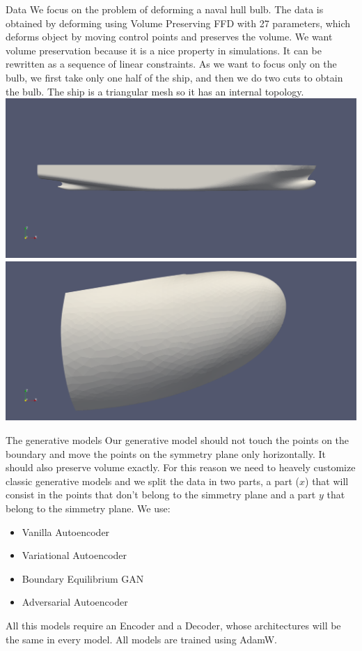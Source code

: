\documentclass{beamer}
\begin{document}
\begin{frame}{Data}
We focus on the problem of deforming a naval hull bulb. The data is obtained by deforming using Volume Preserving FFD with 27 parameters, which deforms object by moving control points and preserves the volume. We want volume preservation because it is a nice property in simulations. It can be rewritten as a sequence of linear constraints. As we want to focus only on the bulb, we first take only one half of the ship, and then we do two cuts to obtain the bulb.  The ship is a triangular mesh so it has an internal topology.\\
\includegraphics[scale=0.08]{naval}
\includegraphics[scale=0.08]{bulbo}
\end{frame}
\begin{frame}{The generative models}
Our generative model should not touch the points on the boundary and move the points on the symmetry plane only horizontally. It should also preserve volume exactly. For this reason we need to heavely customize classic generative models and we split the data in two parts, a part ($x$) that will consist in the points that don't belong to the simmetry plane and a part $y$ that belong to the simmetry plane.
We use:
\begin{itemize}
\item Vanilla Autoencoder
\item Variational Autoencoder
\item Boundary Equilibrium GAN
\item Adversarial Autoencoder
\end{itemize}
All this models require an Encoder and a Decoder, whose architectures will be the same in every model.
All models are trained using AdamW.
\end{frame}
\end{document}

